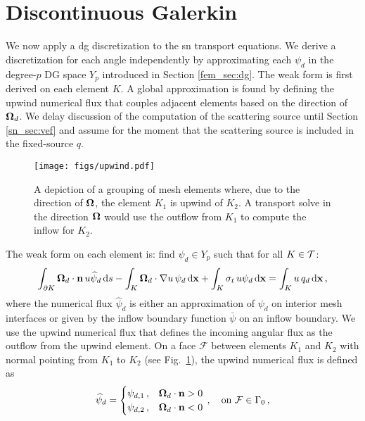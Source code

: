 \documentclass[../doc.tex]{subfiles}
\begin{document}
\section{Discontinuous Galerkin}
We now apply a \gls{dg} discretization to the \gls{sn} transport equations. We derive a discretization for each angle independently by approximating each $\psi_d$ in the degree-$p$ DG space $Y_p$ introduced in Section \ref{fem_sec:dg}. The weak form is first derived on each element $K$. A global approximation is found by defining the upwind numerical flux that couples adjacent elements based on the direction of $\boldsymbol{\Omega}_d$. We delay discussion of the computation of the scattering source until Section \ref{sn_sec:vef} and assume for the moment that the scattering source is included in the fixed-source $q$. 

\begin{figure}
\centering
\texttt{[image: figs/upwind.pdf]}
\caption{A depiction of a grouping of mesh elements where, due to the direction of $\boldsymbol{\Omega}$, the element $K_1$ is upwind of $K_2$. A transport solve in the direction $\boldsymbol{\Omega}$ would use the outflow from $K_1$ to compute the inflow for $K_2$.}
\label{sn:upwind_diag}
\end{figure}
The weak form on each element is: find $\psi_d \in Y_p$ such that for all $K \in \mathcal{T}$: 
	\begin{equation}
		\int_{\partial K} \boldsymbol{\Omega}_d \cdot\boldsymbol{\mathrm{n}}\, u \widehat{\psi}_d \mathop{}\!\mathrm{d} s - \int_K \boldsymbol{\Omega}_d\cdot\nabla u \, \psi_d \mathop{}\!\mathrm{d} \boldsymbol{\mathrm{x}} + \int_K \sigma_t\, u\psi_d \mathop{}\!\mathrm{d} \boldsymbol{\mathrm{x}} = \int_K u\, q_d \mathop{}\!\mathrm{d} \boldsymbol{\mathrm{x}} \,, 
	\end{equation}
where the numerical flux $\widehat{\psi}_d$ is either an approximation of $\psi_d$ on interior mesh interfaces or given by the inflow boundary function $\bar{\psi}$ on an inflow boundary. We use the upwind numerical flux that defines the incoming angular flux as the outflow from the upwind element. On a face $\mathcal{F}$ between elements $K_1$ and $K_2$ with normal pointing from $K_1$ to $K_2$ (see Fig.~\ref{sn:upwind_diag}), the upwind numerical flux is defined as 
	\begin{equation} \label{sn:upwind}
		\widehat{\psi}_d = \begin{cases}
			\psi_{d,1} \,, & \boldsymbol{\Omega}_d\cdot\boldsymbol{\mathrm{n}} > 0 \\
			\psi_{d,2} \,, & \boldsymbol{\Omega}_d\cdot\boldsymbol{\mathrm{n}} < 0 
		\end{cases} \,, \quad \text{on}\ \mathcal{F} \in \Gamma_0 \,, 
	\end{equation}
\end{document}
